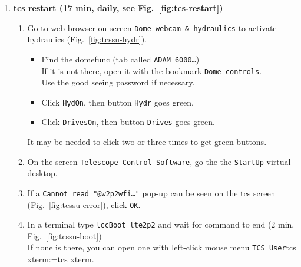 \documentclass[11pt,fleqn]{book} %
\makeatletter
\def\menu#1#2{\texttt{#1}\ifx{}#2\else\@for\@x:=#2\do{$\rightarrow$\texttt{\@x}}\fi}
\def\wmenu#1#2{window menu \menu{#1}{#2}}
\def\mmenu#1#2{left-click mouse menu \menu{#1}{#2}}
\def\fetchob{\wmenu{File}{Load OBs,From file...}}
\makeatother
\begin{document}
\begin{enumerate}
\begin{enumerate}
\begin{itemize}
                    \item If it stays in \texttt{MOVING} or you skipped full restart, reset filtre wheel (Sect.~ \ref{sec:crashfilter}).
                \end{itemize}
          \item In \gls{bob}, execute \texttt{testBias.obd} (1 min)
             \label{list:wfitest}
             \begin{itemize}
               \item Import it with \fetchob.
               \item Click the \texttt{Start} button. 
             \end{itemize}
        \end{enumerate}
  \item \textbf{\gls{tcs} restart (17 min, daily, see Fig.~\ref{fig:tcs-restart})}
        \begin{enumerate}
        \item\label{lab:hydron} Go to web browser on screen \texttt{Dome webcam \& hydraulics} to activate hydraulics (Fig.~\ref{fig:tcssu-hydr}). 
             \begin{itemize}
               \item Find the \gls{domefunc} (tab called \texttt{ADAM 6000…})\\
                     If it is not there, open it with the bookmark \texttt{Dome controls}.\\
                     Use the good seeing password if necessary.
               \item Click \texttt{HydOn}, then button \texttt{Hydr} goes green.
               \item Click \texttt{DrivesOn}, then button \texttt{Drives} goes green.
             \end{itemize}
             It may be needed to click two or three times to get green buttons.
             \label{list:hydr}
          \item On the screen \texttt{Telescope Control Software}, go the the \texttt{StartUp} virtual desktop.\label{list:tcs1}
          \item If a \texttt{Cannot read "@w2p2wfi…"} pop-up can be seen on the \gls{tcs} screen (Fig.~\ref{fig:tcssu-error}), click \texttt{OK}.
          \item In a terminal type \texttt{lccBoot lte2p2} and wait for command to end (2 min, Fig.~\ref{fig:tcssu-boot})\\
                If none is there, you can open one with \mmenu{TCS User}{tcs xterm}.\\

\end{enumerate}
\end{enumerate}
\end{document}
